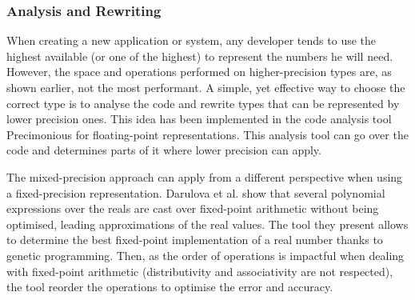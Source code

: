
\subsubsection{Analysis and Rewriting}

When creating a new application or system, any developer tends to use the highest available (or one of the highest) to represent the numbers he will need. However, the space and operations performed on higher-precision types are, as shown earlier, not the most performant. A simple, yet effective way to choose the correct type is to analyse the code and rewrite types that can be represented by lower precision ones. This idea has been implemented in the code analysis tool Precimonious \cite{Rubio2013} for floating-point representations. This analysis tool can go over the code and determines parts of it where lower precision can apply.

The mixed-precision approach can apply from a different perspective when using a fixed-precision representation. Darulova et al. \cite{Darulova2013} show that several polynomial expressions over the reals are cast over fixed-point arithmetic without being optimised, leading approximations of the real values. The tool they present allows to determine the best fixed-point implementation of a real number thanks to genetic programming. Then, as the order of operations is impactful when dealing with fixed-point arithmetic (distributivity and associativity are not respected), the tool reorder the operations to optimise the error and accuracy.

